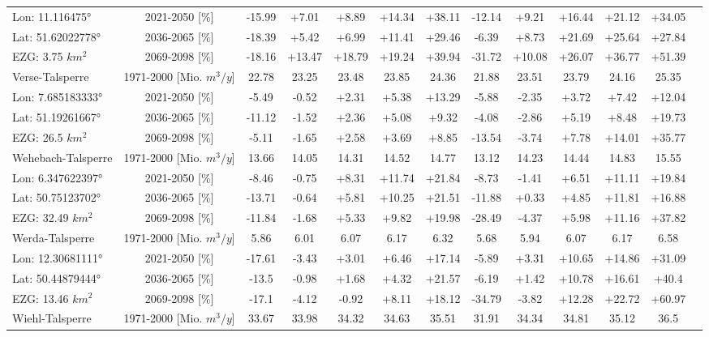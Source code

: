 \begin{longtable}{@{\extracolsep{\fill}}lc|ccccc||cccccc}
\cline{2-13} 
Lon: 11.116475° & 2021-2050 [\%]  & -15.99 & +7.01 & +8.89 & +14.34 & +38.11 & -12.14 & +9.21 & +16.44 & +21.12 & +34.05 & \\ 
Lat: 51.62022778° & 2036-2065 [\%]  & -18.39 & +5.42 & +6.99 & +11.41 & +29.46 & -6.39 & +8.73 & +21.69 & +25.64 & +27.84 & \\ 
EZG: 3.75 $km^2$ & 2069-2098 [\%]  & -18.16 & +13.47 & +18.79 & +19.24 & +39.94 & -31.72 & +10.08 & +26.07 & +36.77 & +51.39 & \\ 
\hline 
Verse-Talsperre & 1971-2000 [Mio. $m^3/y$]  & 22.78 & 23.25 & 23.48 & 23.85 & 24.36 & 21.88 & 23.51 & 23.79 & 24.16 & 25.35 & \\ 
\cline{2-13} 
Lon: 7.685183333° & 2021-2050 [\%]  & -5.49 & -0.52 & +2.31 & +5.38 & +13.29 & -5.88 & -2.35 & +3.72 & +7.42 & +12.04 & \\ 
Lat: 51.19261667° & 2036-2065 [\%]  & -11.12 & -1.52 & +2.36 & +5.08 & +9.32 & -4.08 & -2.86 & +5.19 & +8.48 & +19.73 & \\ 
EZG: 26.5 $km^2$ & 2069-2098 [\%]  & -5.11 & -1.65 & +2.58 & +3.69 & +8.85 & -13.54 & -3.74 & +7.78 & +14.01 & +35.77 & \\ 
\hline 
Wehebach-Talsperre & 1971-2000 [Mio. $m^3/y$]  & 13.66 & 14.05 & 14.31 & 14.52 & 14.77 & 13.12 & 14.23 & 14.44 & 14.83 & 15.55 & \\ 
\cline{2-13} 
Lon: 6.347622397° & 2021-2050 [\%]  & -8.46 & -0.75 & +8.31 & +11.74 & +21.84 & -8.73 & -1.41 & +6.51 & +11.11 & +19.84 & \\ 
Lat: 50.75123702° & 2036-2065 [\%]  & -13.71 & -0.64 & +5.81 & +10.25 & +21.51 & -11.88 & +0.33 & +4.85 & +11.81 & +16.88 & \\ 
EZG: 32.49 $km^2$ & 2069-2098 [\%]  & -11.84 & -1.68 & +5.33 & +9.82 & +19.98 & -28.49 & -4.37 & +5.98 & +11.16 & +37.82 & \\ 
\hline 
Werda-Talsperre & 1971-2000 [Mio. $m^3/y$]  & 5.86 & 6.01 & 6.07 & 6.17 & 6.32 & 5.68 & 5.94 & 6.07 & 6.17 & 6.58 & \\ 
\cline{2-13} 
Lon: 12.30681111° & 2021-2050 [\%]  & -17.61 & -3.43 & +3.01 & +6.46 & +17.14 & -5.89 & +3.31 & +10.65 & +14.86 & +31.09 & \\ 
Lat: 50.44879444° & 2036-2065 [\%]  & -13.5 & -0.98 & +1.68 & +4.32 & +21.57 & -6.19 & +1.42 & +10.78 & +16.61 & +40.4 & \\ 
EZG: 13.46 $km^2$ & 2069-2098 [\%]  & -17.1 & -4.12 & -0.92 & +8.11 & +18.12 & -34.79 & -3.82 & +12.28 & +22.72 & +60.97 & \\ 
\hline 
Wiehl-Talsperre & 1971-2000 [Mio. $m^3/y$]  & 33.67 & 33.98 & 34.32 & 34.63 & 35.51 & 31.91 & 34.34 & 34.81 & 35.12 & 36.5 & \\ 

\end{longtable}

